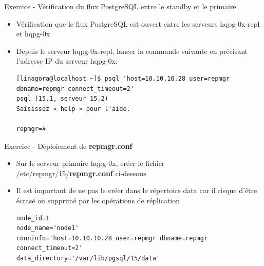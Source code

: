
\begin{frame}[fragile]{Exercice - Vérification du flux PostgreSQL entre le standby et le primaire}

   \begin{itemize}
      \item Vérification que le flux PostgreSQL est ouvert entre les serveurs hqpg-0x-repl et hqpg-0x
      \item Depuis le serveur hqpg-0x-repl, lancer la commande suivante en précisant l'adresse IP du serveur hqpg-0x:
\begin{tiny}
\begin{Verbatim}[commandchars=\\\{\}]
[linagora@localhost ~]$ psql 'host=10.10.10.28 user=repmgr dbname=repmgr connect_timeout=2'
psql (15.1, serveur 15.2)
Saisissez « help » pour l'aide.

repmgr=# 
\end{Verbatim}
\end{tiny}
   \end{itemize}

\end{frame}


\begin{frame}[fragile]{Exercice - Déploiement de \textbf{repmgr.conf}}

   \begin{itemize}
      \item Sur le serveur primaire hqpg-0x, créer le fichier /etc/repmgr/15/\textbf{repmgr.conf} ci-dessous
      \item Il est important de ne pas le créer dans le répertoire data car il risque d'être écrasé ou supprimé par les opérations de réplication
\begin{tiny}
\begin{Verbatim}[commandchars=\\\{\}]
node_id=1
node_name='node1'
conninfo='host=10.10.10.28 user=repmgr dbname=repmgr connect_timeout=2'
data_directory='/var/lib/pgsql/15/data'
\end{Verbatim}
\end{tiny}
   \end{itemize}

\begin{toile}
\end{toile}

\end{frame}

